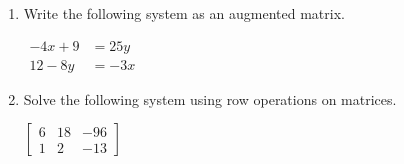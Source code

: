 \documentclass[11pt]{article}
\begin{document}
\begin{enumerate}
{{}
}

\newpage

% 

\item %
\providecommand{\stxKnowl}{}\renewcommand{\stxKnowl}[1]{#1}
\providecommand{\stxOuttro}{}\renewcommand{\stxOuttro}[1]{#1}
\providecommand{\stxTitle}{}\renewcommand{\stxTitle}[1]{#1}
\renewcommand{\stxOuttro}[1]{}
\stxKnowl{
Write the following system as an augmented matrix.

\(\begin{aligned} -4x + 9 &= 25y \\ 12 - 8y &= -3x \end{aligned}\)

\stxOuttro{
Solution

\[\begin{aligned} -4x - 25y &= -9 \\ -3x + 8y &= 12 \end{aligned}\]

\[\boxed{ \left[\begin{array}{cc|c} -4 & -25 & -9 \\ -3 & 8 & 12 \end{array}\right] }\]

}
}

\newpage

% 

\item %
\providecommand{\stxKnowl}{}\renewcommand{\stxKnowl}[1]{#1}
\providecommand{\stxOuttro}{}\renewcommand{\stxOuttro}[1]{#1}
\providecommand{\stxTitle}{}\renewcommand{\stxTitle}[1]{#1}
\renewcommand{\stxOuttro}[1]{}
\stxKnowl{
Solve the following system using row operations on matrices.

\(\left[\begin{array}{cc|c} 6 & 18 & -96 \\ 1 & 2 & -13 \end{array}\right]\)

\stxOuttro{
Solution

}}
\end{enumerate}
\end{document}
